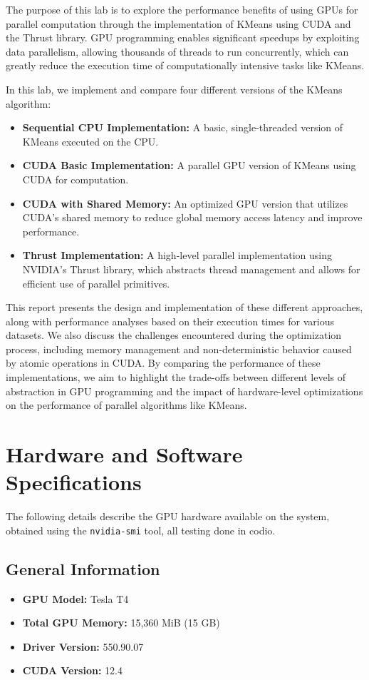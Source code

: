 \documentclass[letterpaper,12pt]{article}
\theoremstyle{remark}
\begin{document}
The purpose of this lab is to explore the performance benefits of using GPUs for parallel computation through the implementation of KMeans using CUDA and the Thrust library. GPU programming enables significant speedups by exploiting data parallelism, allowing thousands of threads to run concurrently, which can greatly reduce the execution time of computationally intensive tasks like KMeans. 

In this lab, we implement and compare four different versions of the KMeans algorithm:
\begin{itemize}
    \item \textbf{Sequential CPU Implementation:} A basic, single-threaded version of KMeans executed on the CPU.
    \item \textbf{CUDA Basic Implementation:} A parallel GPU version of KMeans using CUDA for computation.
    \item \textbf{CUDA with Shared Memory:} An optimized GPU version that utilizes CUDA's shared memory to reduce global memory access latency and improve performance.
    \item \textbf{Thrust Implementation:} A high-level parallel implementation using NVIDIA's Thrust library, which abstracts thread management and allows for efficient use of parallel primitives.
\end{itemize}

This report presents the design and implementation of these different approaches, along with performance analyses based on their execution times for various datasets. We also discuss the challenges encountered during the optimization process, including memory management and non-deterministic behavior caused by atomic operations in CUDA. By comparing the performance of these implementations, we aim to highlight the trade-offs between different levels of abstraction in GPU programming and the impact of hardware-level optimizations on the performance of parallel algorithms like KMeans.



\section{Hardware and Software Specifications}

\small
The following details describe the GPU hardware available on the system, obtained using the \texttt{nvidia-smi} tool, all testing done in codio.

\subsection{General Information}
\begin{itemize}
    \item \textbf{GPU Model:} Tesla T4
    \item \textbf{Total GPU Memory:} 15,360 MiB (15 GB)
    \item \textbf{Driver Version:} 550.90.07
    \item \textbf{CUDA Version:} 12.4
\end{itemize}
\end{document}

